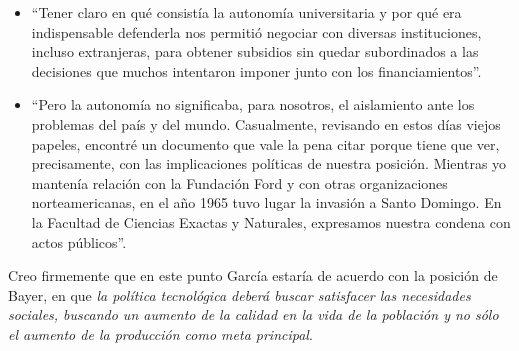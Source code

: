 \begin{itemize}
    \item ``Tener claro en qué consistía la autonomía universitaria y por qué era indispensable defenderla nos permitió negociar con diversas instituciones, incluso extranjeras, para obtener subsidios sin quedar subordinados a las decisiones que muchos intentaron imponer junto con los financiamientos''.
    \item ``Pero la autonomía no significaba, para nosotros, el aislamiento ante los problemas del país y del mundo. Casualmente, revisando en estos días viejos papeles, encontré un documento que vale la pena citar porque tiene que ver, precisamente, con las implicaciones políticas de nuestra posición. Mientras yo mantenía relación con la Fundación Ford y con otras organizaciones norteamericanas, en el año 1965 tuvo lugar la invasión a Santo Domingo. En la Facultad de Ciencias Exactas y Naturales, expresamos nuestra condena con actos públicos''.
\end{itemize}

Creo firmemente que en este punto García estaría de acuerdo con la posición de Bayer, en que \textit{la política tecnológica deberá buscar satisfacer las necesidades sociales, buscando un aumento de la calidad en la vida de la población y no sólo el aumento de la producción como meta principal}.



